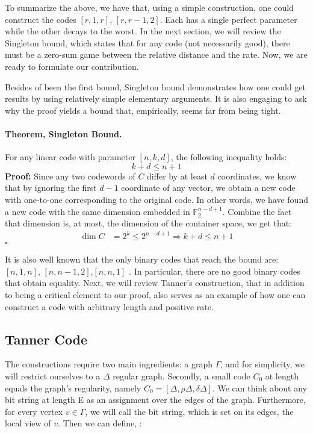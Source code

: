 \documentclass{article}
\begin{document}
\begin{multicols*}{2}
To summarize the above, we have that, using a simple construction, one could construct the codes $[r, 1, r]$, $[r, r-1, 2]$. Each has a single perfect parameter while the other decays to the worst. In the next section, we will review the Singleton bound, which states that for any code (not necessarily good), there must be a zero-sum game between the relative distance and the rate.
Now, we are ready to formulate our contribution. 


Besides of been the first bound, Singleton bound demonstrates how one could get results by using relatively simple elementary arguments. It is also engaging to ask why the proof yields a bound that, empirically, seems far from being tight.
\paragraph{Theorem, Singleton Bound.} For any linear code with parameter $[n,k,d]$, the following inequality holds:
\begin{equation*}
    k+ d \le n + 1
\end{equation*} 
\textbf{Proof:} Since any two codewords of $C$ differ by at least $d$ coordinates, we know that by ignoring the first $d-1$ coordinate of any vector, we obtain a new code with one-to-one corresponding to the original code. In other words, we have found a new code with the same dimension embedded in $\mathbb{F}_{2}^{n-d+1}$. Combine the fact that dimension is, at most, the dimension of the container space, we get that:  
\begin{equation*}
  \begin{split}
    \dim C &= 2^{k} \le 2^{n-d+1} \Rightarrow k+d \le n + 1
  \end{split}
\end{equation*}
$\square$

It is also well known that the only binary codes that reach the bound are: $[n,1,n]$, $[n,n-1,2]$,$[n,n,1]$ \cite{eczoo_mds}. In particular, there are no good binary codes that obtain equality. Next, we will review Tanner's construction, that in addition to being a critical element to our proof, also serves as an example of how one can construct a code with arbitrary length and positive rate.
\subsection{Tanner Code}
The constructions require two main ingredients: a graph $\Gamma$, and for simplicity, we will restrict ourselves to a $\Delta$ regular graph. Secondly, a small code $C_{0}$ at length equals the graph's regularity, namely $C_{0} = [\Delta,\rho\Delta, \delta\Delta]$. We can think about any bit string at length E as an assignment over the edges of the graph. Furthermore, for every vertex $v \in \Gamma$, we will call the bit string, which is set on its edges, the local view of $v$.  Then we can define, \cite{Tanner}:

\end{multicols*}
\end{document}
